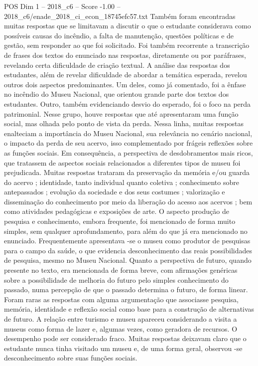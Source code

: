 \begin{textsample}{POS Dim 1 – 2018\_c6 – Score -1.00 – 2018\_c6/enade\_2018\_ci\_econ\_18745efc57.txt}
Também foram encontradas muitas respostas que se limitavam a discutir o que o estudante considerava como possíveis causas do incêndio, a falta de manutenção, questões políticas e de gestão, sem responder ao que foi solicitado.
Foi também recorrente a transcrição de frases dos textos do enunciado nas respostas, diretamente ou por paráfrases, revelando certa dificuldade de criação textual.
A análise das respostas dos estudantes, além de revelar dificuldade de abordar a temática esperada, revelou outros dois aspectos predominantes.
Um deles, como já comentado, foi a ênfase no incêndio do Museu Nacional, que orientou grande parte dos textos dos estudantes.
Outro, também evidenciando desvio do esperado, foi o foco na perda patrimonial.
Nesse grupo, houve respostas que até apresentaram uma função social, mas olhada pelo ponto de vista da perda.
Nessa linha, muitas respostas enalteciam a importância do Museu Nacional, sua relevância no cenário nacional, o impacto da perda de seu acervo, isso complementado por frágeis reflexões sobre as funções sociais.
Em consequência, a perspectiva de desdobramentos mais ricos, que tratassem de aspectos sociais relacionados a diferentes tipos de museu foi prejudicada.
Muitas respostas trataram da preservação da memória e/ou guarda do acervo ; identidade, tanto individual quanto coletiva ; conhecimento sobre antepassados ; evolução da sociedade e dos seus costumes ; valorização e disseminação do conhecimento por meio da liberação do acesso aos acervos ; bem como atividades pedagógicas e exposições de arte.
O aspecto produção de pesquisa e conhecimento, embora frequente, foi mencionado de forma muito simples, sem qualquer aprofundamento, para além do que já era mencionado no enunciado.
Frequentemente apresentava -se o museu como produtor de pesquisas para o campo da saúde, o que evidencia desconhecimento das reais possibilidades de pesquisa, mesmo no Museu Nacional.
Quanto a perspectiva de futuro, quando presente no texto, era mencionada de forma breve, com afirmações genéricas sobre a possibilidade de melhoria do futuro pelo simples conhecimento do passado, numa percepção de que o passado determina o futuro, de forma linear.
Foram raras as respostas com alguma argumentação que associasse pesquisa, memória, identidade e reflexão social como base para a construção de alternativas de futuro.
A relação entre turismo e museu apareceu considerando a visita a museus como forma de lazer e, algumas vezes, como geradora de recursos.
O desempenho pode ser considerado fraco.
Muitas respostas deixavam claro que o estudante nunca tinha visitado um museu e, de uma forma geral, observou -se desconhecimento sobre suas funções sociais.

\end{textsample}
